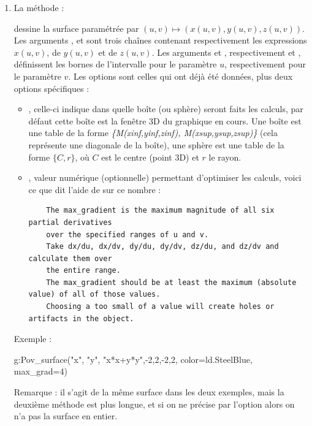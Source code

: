 \begin{itemize}
\begin{enumerate}
        \item La méthode : 

        dessine la surface paramétrée par $(u,v)\mapsto (x(u,v), y(u,v), z(u,v))$. Les arguments ,  et  sont trois chaînes contenant respectivement les expressions $x(u,v)$, de $y(u,v)$ et de $z(u,v)$.
        Les arguments  et , respectivement  et ,  définissent les bornes de l'intervalle pour le paramètre $u$, respectivement pour le paramètre $v$.
        Les options sont celles qui ont déjà été données, plus deux options spécifiques : 
        \begin{itemize}
            \item {}, celle-ci indique dans quelle boîte (ou sphère) seront faits les calculs, par défaut cette boîte est la fenêtre 3D du graphique en cours. Une boîte est une table de la forme \emph{\{M(xinf,yinf,zinf), M(xsup,ysup,zsup)\}} (cela représente une diagonale de la boîte), une sphère est une table de la forme $\{C,r\}$, où $C$ est le centre (point 3D) et $r$ le rayon. 
            \item {}, valeur numérique (optionnelle) permettant d'optimiser les calculs, voici ce que dit l'aide de \povray sur ce nombre :
            \begin{small}
            \begin{verbatim}
    The max_gradient is the maximum magnitude of all six partial derivatives 
    over the specified ranges of u and v.
    Take dx/du, dx/dv, dy/du, dy/dv, dz/du, and dz/dv and calculate them over 
    the entire range.
    The max_gradient should be at least the maximum (absolute value) of all of those values.
    Choosing a too small of a value will create holes or artifacts in the object.
            \end{verbatim}
            \end{small}
        \end{itemize}
         Exemple :
        \begin{Luacode}
        g:Pov_surface("x", "y", "x*x+y*y",-2,2,-2,2, {color=ld.SteelBlue, max_grad=4})
        \end{Luacode}
        Remarque : il s'agit de la même surface dans les deux exemples, mais la deuxième méthode est plus longue, et si on ne précise par l'option  alors on n'a pas la surface en entier. 
        \end{enumerate}
          


\end{itemize}
